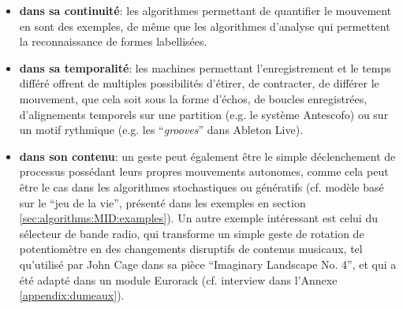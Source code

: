 \begin{itemize}[noitemsep]
	\item \textbf{dans sa continuité}: les algorithmes permettant de quantifier le mouvement en sont des exemples, de même que les algorithmes d'analyse qui permettent la reconnaissance de formes labellisées.
	
	\item \textbf{dans sa temporalité}: les machines permettant l'enregistrement et le temps différé offrent de multiples possibilités d'étirer, de contracter, de différer le mouvement, que cela soit sous la forme d'échos, de boucles enregistrées, d'alignements temporels sur une partition (e.g. le système Antescofo) ou sur un motif rythmique (e.g. les ``\textit{grooves}'' dans Ableton Live).

	\item \textbf{dans son contenu}: un geste peut également être le simple déclenchement de processus possédant leurs propres mouvements autonomes, comme cela peut être le cas dans les algorithmes stochastiques ou génératifs (cf. modèle basé sur le ``jeu de la vie'', présenté dans les exemples en section \ref{sec:algorithms:MID:examples}). Un autre exemple intéressant est celui du sélecteur de bande radio, qui transforme un simple geste de rotation de potentiomètre en des changements disruptifs de contenus musicaux, tel qu'utilisé par John Cage dans sa pièce ``Imaginary Landscape No. 4'', et qui a été adapté dans un module Eurorack (cf. interview dans l'Annexe \ref{appendix:dumeaux}).

\end{itemize}


